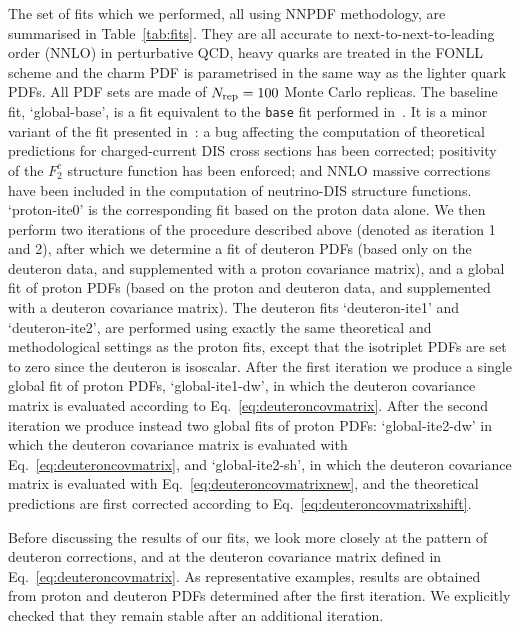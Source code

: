 \documentclass[11pt,a4paper]{article}
\begin{document}
The set of fits which we performed, all using NNPDF methodology, are summarised
in Table~\ref{tab:fits}. They are all accurate to next-to-next-to-leading order
(NNLO) in perturbative QCD, heavy quarks are treated in the FONLL scheme and
the charm PDF is parametrised in the same way as the lighter quark
PDFs. All PDF sets are made of $N_{\rm rep}=100$ Monte Carlo replicas.
The baseline fit, `global-base', is a fit equivalent to the {\tt base} fit
performed in~\cite{Faura:2020oom}.
It is a minor variant of the fit presented in~\cite{Ball:2018iqk}: a bug
affecting the computation of theoretical predictions for charged-current DIS
cross sections has been corrected; positivity of the $F_2^c$ structure
function has been enforced; and NNLO massive
corrections~\cite{Berger:2016inr,Gao:2017kkx}
have been included in the computation of neutrino-DIS structure functions. 
`proton-ite0' is the corresponding fit based on the proton data alone.
We then perform two iterations of the procedure
described above (denoted as iteration 1 and 2), after which we determine a
fit of deuteron PDFs (based only on the deuteron data, and
supplemented with a proton covariance matrix), and a global fit of proton PDFs
(based on the proton and deuteron data, and supplemented with a
deuteron covariance matrix). The deuteron fits 
`deuteron-ite1' and `deuteron-ite2', are performed using exactly the same
theoretical and methodological settings as the proton fits, except that the
isotriplet PDFs are set to zero since the deuteron is isoscalar. After the first
iteration we produce a single global fit of proton PDFs, `global-ite1-dw',
in which the deuteron covariance matrix is evaluated according to
Eq.~\eqref{eq:deuteroncovmatrix}. After the second iteration we produce instead
two global fits of proton PDFs: `global-ite2-dw' in which the deuteron
covariance matrix
is evaluated with Eq.~\eqref{eq:deuteroncovmatrix}, and `global-ite2-sh',
in which the deuteron covariance matrix is evaluated with
Eq.~\eqref{eq:deuteroncovmatrixnew}, and the theoretical predictions are 
first corrected according to Eq.~\eqref{eq:deuteroncovmatrixshift}.

Before discussing the results of our fits, we look more closely at the pattern
of deuteron corrections, and at the deuteron covariance matrix defined in
Eq.~\eqref{eq:deuteroncovmatrix}. As representative examples, results are
obtained from proton and deuteron PDFs determined after the first iteration.
We explicitly checked that they remain stable after an additional iteration.
\end{document}

